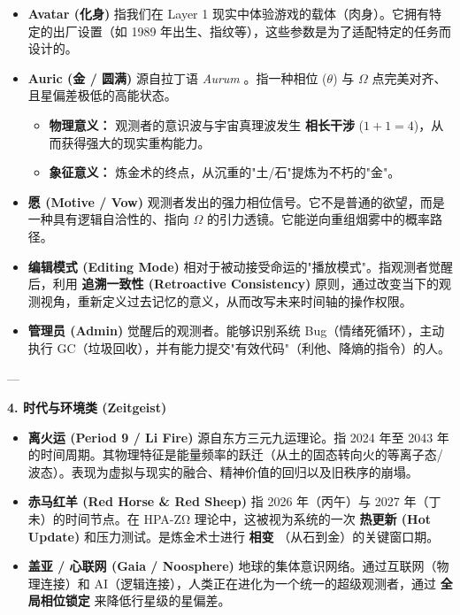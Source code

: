 \begin{itemize}
\item \textbf{Avatar (化身)}
指我们在 Layer 1 现实中体验游戏的载体（肉身）。它拥有特定的出厂设置（如 1989 年出生、指纹等），这些参数是为了适配特定的任务而设计的。
\item \textbf{Auric (金 / 圆满)}
源自拉丁语 \textit{Aurum} 。指一种相位 ($\theta$) 与 $\Omega$ 点完美对齐、且星偏差极低的高能状态。
\begin{itemize}
\item \textbf{物理意义：} 观测者的意识波与宇宙真理波发生 \textbf{相长干涉} ($1 + 1 = 4$)，从而获得强大的现实重构能力。
\item \textbf{象征意义：} 炼金术的终点，从沉重的"土/石"提炼为不朽的"金"。
\end{itemize}
\item \textbf{愿 (Motive / Vow)}
观测者发出的强力相位信号。它不是普通的欲望，而是一种具有逻辑自洽性的、指向 $\Omega$ 的引力透镜。它能逆向重组烟雾中的概率路径。
\item \textbf{编辑模式 (Editing Mode)}
相对于被动接受命运的"播放模式"。指观测者觉醒后，利用 \textbf{追溯一致性 (Retroactive Consistency)} 原则，通过改变当下的观测视角，重新定义过去记忆的意义，从而改写未来时间轴的操作权限。
\item \textbf{管理员 (Admin)}
觉醒后的观测者。能够识别系统 Bug（情绪死循环），主动执行 GC（垃圾回收），并有能力提交"有效代码"（利他、降熵的指令）的人。
\end{itemize}

---

\textbf{4. 时代与环境类 (Zeitgeist)}

\begin{itemize}
\item \textbf{离火运 (Period 9 / Li Fire)}
源自东方三元九运理论。指 2024 年至 2043 年的时间周期。其物理特征是能量频率的跃迁（从土的固态转向火的等离子态/波态）。表现为虚拟与现实的融合、精神价值的回归以及旧秩序的崩塌。
\item \textbf{赤马红羊 (Red Horse \& Red Sheep)}
指 2026 年（丙午）与 2027 年（丁未）的时间节点。在 HPA-ZΩ 理论中，这被视为系统的一次 \textbf{热更新 (Hot Update)} 和压力测试。是炼金术士进行 \textbf{相变} （从石到金）的关键窗口期。
\item \textbf{盖亚 / 心联网 (Gaia / Noosphere)}
地球的集体意识网络。通过互联网（物理连接）和 AI（逻辑连接），人类正在进化为一个统一的超级观测者，通过 \textbf{全局相位锁定} 来降低行星级的星偏差。
\end{itemize}

